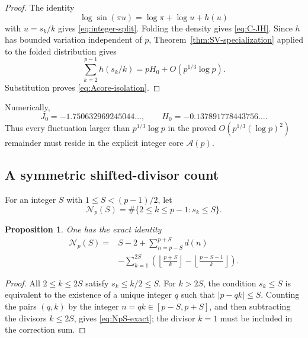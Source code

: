 \documentclass[11pt]{amsart}
\numberwithin{equation}{section}
\newtheorem{proposition}[theorem]{Proposition}
\theoremstyle{definition}
\theoremstyle{remark}
\begin{document}
\begin{proof}
The identity
\[
 \log\sin(\pi u)=\log\pi+\log u+h(u)
\]
with \(u=s_k/k\) gives \eqref{eq:integer-split}.  Folding the density gives
\eqref{eq:C-JH}.  Since \(h\) has bounded variation independent of \(p\),
Theorem~\ref{thm:SV-specialization} applied to the folded distribution gives
\[
 \sum_{k=2}^{p-1}h(s_k/k)=pH_0+O(p^{1/3}\log p).
\]
Substitution proves \eqref{eq:Acore-isolation}.
\end{proof}

Numerically,
\begin{equation}\label{eq:JH-numerical}
 J_0=-1.750632969245044\ldots,
 \qquad H_0=-0.137891778443756\ldots.
\end{equation}
Thus every fluctuation larger than \(p^{1/3}\log p\) in the proved
\(O(p^{1/3}(\log p)^2)\) remainder must reside in the explicit integer
core \(\mathcal A(p)\).

\subsection{A symmetric shifted-divisor count}

For an integer \(S\) with \(1\le S<(p-1)/2\), let
\begin{equation}\label{eq:NpS-def}
 \mathcal N_p(S)=\#\{2\le k\le p-1:s_k\le S\}.
\end{equation}

\begin{proposition}\label{prop:NpS-exact}
One has the exact identity
\begin{equation}\label{eq:NpS-exact}
\begin{aligned}
 \mathcal N_p(S)
={}&S-2+\sum_{n=p-S}^{p+S}d(n)\\
&-\sum_{k=1}^{2S}
 \left(\left\lfloor\frac{p+S}{k}\right\rfloor
       -\left\lfloor\frac{p-S-1}{k}\right\rfloor\right).
\end{aligned}
\end{equation}
\end{proposition}

\begin{proof}
All \(2\le k\le2S\) satisfy \(s_k\le k/2\le S\).  For \(k>2S\), the
condition \(s_k\le S\) is equivalent to the existence of a unique integer
\(q\) such that \(|p-qk|\le S\).  Counting the pairs \((q,k)\) by the
integer \(n=qk\in[p-S,p+S]\), and then subtracting the divisors
\(k\le2S\), gives \eqref{eq:NpS-exact}; the divisor \(k=1\) must be
included in the correction sum.
\end{proof}
\end{document}
